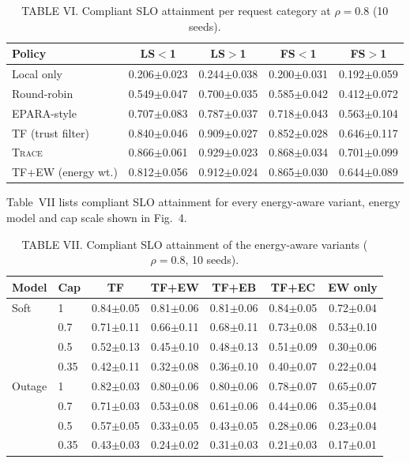 \documentclass{article}
\begin{document}
\begin{table}[h]

\caption{TABLE VI. Compliant SLO attainment per request category at $\rho=0.8$ (10 seeds).}\label{tab:category}
\begin{tabular}{lcccc}
\toprule
Policy & LS$<$1 & LS$>$1 & FS$<$1 & FS$>$1 \\
\midrule
Local only & 0.206$\pm$0.023 & 0.244$\pm$0.038 & 0.200$\pm$0.031 & 0.192$\pm$0.059 \\
Round-robin & 0.549$\pm$0.047 & 0.700$\pm$0.035 & 0.585$\pm$0.042 & 0.412$\pm$0.072 \\
EPARA-style & 0.707$\pm$0.083 & 0.787$\pm$0.037 & 0.718$\pm$0.043 & 0.563$\pm$0.104 \\
TF (trust filter) & 0.840$\pm$0.046 & 0.909$\pm$0.027 & 0.852$\pm$0.028 & 0.646$\pm$0.117 \\
\textsc{Trace} & 0.866$\pm$0.061 & 0.929$\pm$0.023 & 0.868$\pm$0.034 & 0.701$\pm$0.099 \\
TF+EW (energy wt.) & 0.812$\pm$0.056 & 0.912$\pm$0.024 & 0.865$\pm$0.030 & 0.644$\pm$0.089 \\
\bottomrule
\end{tabular}

\end{table}

Table~VII lists compliant SLO attainment for every energy-aware variant, energy model and cap scale shown in Fig.~4.

\begin{table}[h]

\caption{TABLE VII. Compliant SLO attainment of the energy-aware variants ($\rho=0.8$, 10 seeds).}\label{tab:energyfull}
\begin{tabular}{llccccc}
\toprule
Model & Cap & TF & TF+EW & TF+EB & TF+EC & EW only \\
\midrule
Soft & 1 & 0.84$\pm$0.05 & 0.81$\pm$0.06 & 0.81$\pm$0.06 & 0.84$\pm$0.05 & 0.72$\pm$0.04 \\
 & 0.7 & 0.71$\pm$0.11 & 0.66$\pm$0.11 & 0.68$\pm$0.11 & 0.73$\pm$0.08 & 0.53$\pm$0.10 \\
 & 0.5 & 0.52$\pm$0.13 & 0.45$\pm$0.10 & 0.48$\pm$0.13 & 0.51$\pm$0.09 & 0.30$\pm$0.06 \\
 & 0.35 & 0.42$\pm$0.11 & 0.32$\pm$0.08 & 0.36$\pm$0.10 & 0.40$\pm$0.07 & 0.22$\pm$0.04 \\
\midrule
Outage & 1 & 0.82$\pm$0.03 & 0.80$\pm$0.06 & 0.80$\pm$0.06 & 0.78$\pm$0.07 & 0.65$\pm$0.07 \\
 & 0.7 & 0.71$\pm$0.03 & 0.53$\pm$0.08 & 0.61$\pm$0.06 & 0.44$\pm$0.06 & 0.35$\pm$0.04 \\
 & 0.5 & 0.57$\pm$0.05 & 0.33$\pm$0.05 & 0.43$\pm$0.05 & 0.28$\pm$0.06 & 0.23$\pm$0.04 \\
 & 0.35 & 0.43$\pm$0.03 & 0.24$\pm$0.02 & 0.31$\pm$0.03 & 0.21$\pm$0.03 & 0.17$\pm$0.01 \\
\bottomrule
\end{tabular}

\end{table}
\end{document}
